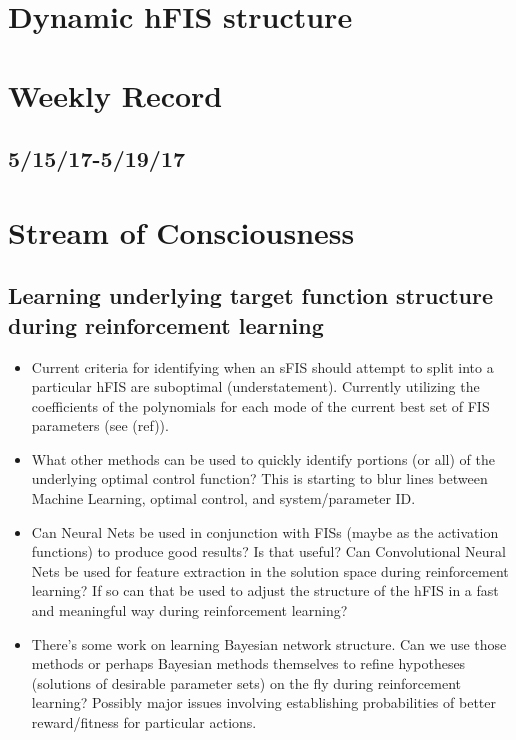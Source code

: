 \documentclass[11pt]{article} %
\begin{document}
\section{Dynamic hFIS structure}

\section{Weekly Record}
\subsection{5/15/17-5/19/17}

\section{Stream of Consciousness}
\subsection{Learning underlying target function structure during reinforcement learning}
\begin{itemize}
\item Current criteria for identifying when an sFIS should attempt to split into a particular hFIS are suboptimal (understatement). Currently utilizing the coefficients of the polynomials for each mode of the current best set of FIS parameters (see (ref)).
\item What other methods can be used to quickly identify portions (or all) of the underlying optimal control function? This is starting to blur lines between Machine Learning, optimal control, and system/parameter ID.
\item Can Neural Nets be used in conjunction with FISs (maybe as the activation functions) to produce good results? Is that useful? Can Convolutional Neural Nets be used for feature extraction in the solution space during reinforcement learning? If so can that be used to adjust the structure of the hFIS in a fast and meaningful way during reinforcement learning?
\item There's some work on learning Bayesian network structure. Can we use those methods or perhaps Bayesian methods themselves to refine hypotheses (solutions of desirable parameter sets) on the fly during reinforcement learning? Possibly major issues involving establishing probabilities of better reward/fitness for particular actions.
\end{itemize}
\end{document}
